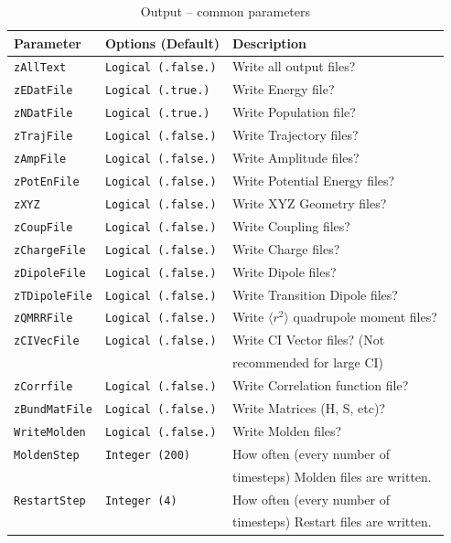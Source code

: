 \documentclass[11pt]{article}
\begin{document}
\clearpage
\newpage
\begin{table}[h]
\caption{Output -- common parameters}
\begin{tabular}{ l l l }
\hline\hline
Parameter & Options (Default)& Description \\
\hline
{\tt zAllText}               & {\tt Logical (.false.)}& {\small Write all output files?}\\
{\tt zEDatFile}              & {\tt Logical (.true.)} & {\small Write Energy file?}\\
{\tt zNDatFile}              & {\tt Logical (.true.)} & {\small Write Population file?}\\
{\tt zTrajFile}              & {\tt Logical (.false.)}& {\small Write Trajectory files?}\\
{\tt zAmpFile}               & {\tt Logical (.false.)}& {\small Write Amplitude files?}\\
{\tt zPotEnFile}             & {\tt Logical (.false.)}& {\small Write Potential Energy files?}\\
{\tt zXYZ}                   & {\tt Logical (.false.)}& {\small Write XYZ Geometry files?}\\
{\tt zCoupFile}              & {\tt Logical (.false.)}& {\small Write Coupling files?}\\
{\tt zChargeFile}            & {\tt Logical (.false.)}& {\small Write Charge files?}\\
{\tt zDipoleFile}            & {\tt Logical (.false.)}& {\small Write Dipole files?}\\
{\tt zTDipoleFile}           & {\tt Logical (.false.)}& {\small Write Transition Dipole files?}\\
{\tt zQMRRFile}              & {\tt Logical (.false.)}& {\small Write $\langle r^2 \rangle$ quadrupole moment files?}\\
{\tt zCIVecFile}             & {\tt Logical (.false.)}& {\small Write CI Vector files? (Not}\\&&
                                                        {\small recommended for large CI)}\\
{\tt zCorrfile}              & {\tt Logical (.false.)}& {\small Write Correlation function file?}\\
{\tt zBundMatFile}           & {\tt Logical (.false.)}& {\small Write Matrices (H, S, etc)?}\\
{\tt WriteMolden}            & {\tt Logical (.false.)}& {\small Write Molden files?}\\
{\tt MoldenStep}             & {\tt Integer (200)}    & {\small How often (every number of}\\&&
                                                        {\small timesteps) Molden files are written.}\\
{\tt RestartStep}            & {\tt Integer (4)}      & {\small How often (every number of}\\&&
                                                        {\small timesteps) Restart files are written.}\\
\hline\hline
\end{tabular}
\end{table}
\end{document}
